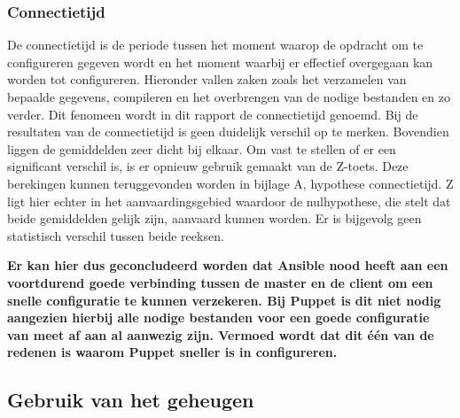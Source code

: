 \subsubsection{Connectietijd}

De \gls{connectietijd} is de periode tussen het moment waarop de opdracht om te configureren gegeven wordt en het moment waarbij er effectief overgegaan kan worden tot configureren. Hieronder vallen zaken zoals het verzamelen van bepaalde gegevens, compileren en het overbrengen van de nodige bestanden en zo verder. Dit fenomeen wordt in dit rapport de \gls{connectietijd} genoemd. Bij de resultaten van de connectietijd is geen duidelijk verschil op te merken. Bovendien liggen de gemiddelden zeer dicht bij elkaar. Om vast te stellen of er een significant verschil is, is er opnieuw gebruik gemaakt van de Z-toets. Deze berekingen kunnen teruggevonden worden in bijlage A, hypothese connectietijd. Z ligt hier echter in het aanvaardingsgebied waardoor de nulhypothese, die stelt dat beide gemiddelden gelijk zijn, aanvaard kunnen worden. Er is bijgevolg geen statistisch verschil tussen beide reeksen.

\textbf{Er kan hier dus geconcludeerd worden dat Ansible nood heeft aan een voortdurend goede verbinding tussen de master en de client om een snelle configuratie te kunnen verzekeren. Bij Puppet is dit niet nodig aangezien hierbij alle nodige bestanden voor een goede configuratie van meet af aan al aanwezig zijn. Vermoed wordt dat dit \'e\'en van de redenen is waarom Puppet sneller is in configureren.}






\subsection{Gebruik van het geheugen}

